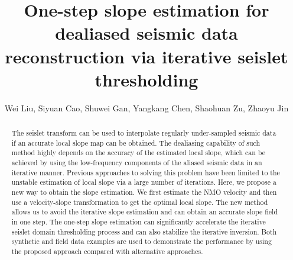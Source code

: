   
\title{One-step slope estimation for dealiased seismic data reconstruction via iterative seislet thresholding}
\renewcommand{\thefootnote}{\fnsymbol{footnote}}

\author{Wei Liu\footnotemark[1], Siyuan Cao\footnotemark[1], Shuwei Gan\footnotemark[1], Yangkang Chen\footnotemark[2], Shaohuan Zu\footnotemark[1], Zhaoyu Jin\footnotemark[3]}
\address{
\footnotemark[1]
State Key Laboratory of Petroleum Resources and Prospecting, 
China University of Petroleum, 
Fuxue Road 18th,
Beijing, China, 102200, 
Email: liuwei\_upc@126.com \& csy@cup.edu.cn \& gsw19900128@126.com \& zushaohuan@qq.com\\
\footnotemark[2] Jackson School of Geosciences,
The University of Texas at Austin,
University Station, Box X,
Austin, TX 78713-8924, USA,
Email: ykchen@utexas.edu\\
\footnotemark[3]School of Geosciences,
University of Edinburgh,
Edinburgh,UK, EH9 3JW,
Email: s1263999@sms.ed.ac.uk
}

\maketitle

\begin{abstract}
The seislet transform can be used to interpolate regularly under-sampled seismic data if an accurate local slope map can be obtained. The dealiasing capability of such method highly depends on the accuracy of the estimated local slope, which can be achieved by using the low-frequency components of the aliased seismic data in an iterative manner. Previous approaches to solving this problem have been limited to the unstable estimation of local slope via a large number of iterations. Here, we propose a new way to obtain the slope estimation. We first estimate the NMO velocity and then use a velocity-slope transformation to get the optimal local slope. The new method allows us to avoid the iterative slope estimation and can obtain an accurate slope field in one step. The one-step slope estimation can significantly accelerate the iterative seislet domain thresholding process and can also stabilize the iterative inversion. Both synthetic and field data examples are used to demonstrate the performance by using the proposed approach compared with alternative approaches. 
\end{abstract}

